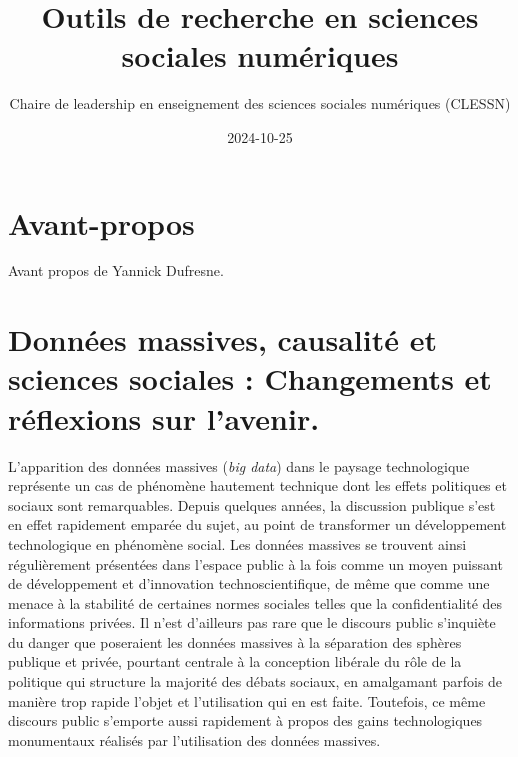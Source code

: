 \documentclass[
  letterpaper,
  DIV=11,
  numbers=noendperiod]{scrreprt}
\title{Outils de recherche en sciences sociales numériques}
\author{Chaire de leadership en enseignement des sciences sociales
numériques (CLESSN)}
\date{2024-10-25}
\renewcommand*\contentsname{Table of contents}
\newcommand\contentsname{Table of contents}
\begin{document}
\maketitle
\ifdefined\Shaded\renewenvironment{Shaded}{\begin{tcolorbox}[boxrule=0pt, interior hidden, enhanced, sharp corners, frame hidden, borderline west={3pt}{0pt}{shadecolor}, breakable]}{\end{tcolorbox}}\fi

\renewcommand*\contentsname{Table of contents}
{
\hypersetup{linkcolor=}
\setcounter{tocdepth}{2}
\tableofcontents
}

\hypertarget{avant-propos}{%
\chapter*{Avant-propos}\label{avant-propos}}


Avant propos de Yannick Dufresne.


\hypertarget{donnuxe9es-massives-causalituxe9-et-sciences-sociales-changements-et-ruxe9flexions-sur-lavenir.}{%
\chapter*{Données massives, causalité et sciences sociales : Changements
et réflexions sur
l'avenir.}\label{donnuxe9es-massives-causalituxe9-et-sciences-sociales-changements-et-ruxe9flexions-sur-lavenir.}}


L'apparition des données massives (\emph{big data}) dans le paysage
technologique représente un cas de phénomène hautement technique dont
les effets politiques et sociaux sont remarquables. Depuis quelques
années, la discussion publique s'est en effet rapidement emparée du
sujet, au point de transformer un développement technologique en
phénomène social. Les données massives se trouvent ainsi régulièrement
présentées dans l'espace public à la fois comme un moyen puissant de
développement et d'innovation technoscientifique, de même que comme une
menace à la stabilité de certaines normes sociales telles que la
confidentialité des informations privées. Il n'est d'ailleurs pas rare
que le discours public s'inquiète du danger que poseraient les données
massives à la séparation des sphères publique et privée, pourtant
centrale à la conception libérale du rôle de la politique qui structure
la majorité des débats sociaux, en amalgamant parfois de manière trop
rapide l'objet et l'utilisation qui en est faite. Toutefois, ce même
discours public s'emporte aussi rapidement à propos des gains
technologiques monumentaux réalisés par l'utilisation des données
massives.
\end{document}
